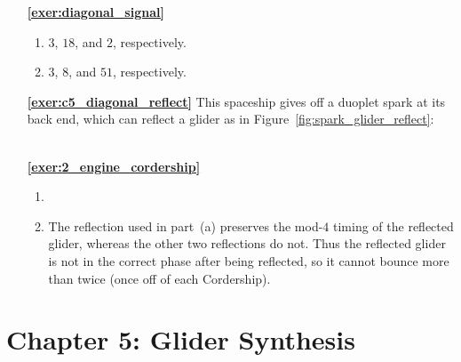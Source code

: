 \begin{multicols}{2}
\begin{itemize}[leftmargin=0em]
		
		\item[\bf\color{ocre}\sffamily\ref{exer:diagonal_signal}]
		\begin{enumerate}[leftmargin=1.5em,label=\bf\color{ocre}(\alph*)]
			\item $3$, $18$, and $2$, respectively. \\
			
			\item $3$, $8$, and $51$, respectively. \\
		\end{enumerate}
		
		
		\item[\bf\color{ocre}\sffamily\ref{exer:c5_diagonal_reflect}] This spaceship gives off a duoplet spark at its back end, which can reflect a glider as in Figure~\ref{fig:spark_glider_reflect}: \\[-0.6em]
		
		 \\
		
		
		\item[\bf\color{ocre}\sffamily\ref{exer:2_engine_cordership}]
		\begin{enumerate}[leftmargin=1.5em,label=\bf\color{ocre}(\alph*)]
			\item {} \\
			
			\item The reflection used in part~(a) preserves the mod-$4$ timing of the reflected glider, whereas the other two reflections do not. Thus the reflected glider is not in the correct phase after being reflected, so it cannot bounce more than twice (once off of each Cordership). \\
		\end{enumerate}
	\end{itemize}
\end{multicols}


\hypertarget{solutions_glider_synthesis}{}\label{solutions_glider_synthesis}
\section*{Chapter 5: Glider Synthesis}
\renewcommand{\chapterfolder}{glider_synthesis/}

